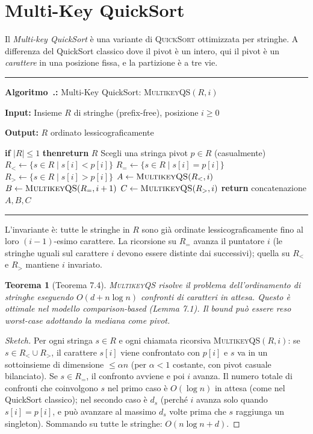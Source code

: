 \documentclass[12pt, a4paper, oneside]{book}
\newcounter{algocf}[chapter]
\renewcommand{\thealgocf}{\thechapter.\arabic{algocf}}
\newenvironment{algorithm}[1][H]{%
  \refstepcounter{algocf}%
  \par\medskip\noindent\rule{\linewidth}{0.4pt}\par\smallskip
}{%
  \par\smallskip\noindent\rule{\linewidth}{0.4pt}\par\medskip
}
\newcommand{\algcaption}[1]{\noindent\textbf{Algoritmo~\thealgocf:} #1\par\smallskip}
\newcommand{\KwIn}[1]{\noindent\textbf{Input:} #1\par}
\newcommand{\KwOut}[1]{\noindent\textbf{Output:} #1\par}
\newcommand{\If}[1]{\noindent\textbf{if} #1 \textbf{then}}
\newcommand{\Return}[1]{\noindent\textbf{return} #1}
\theoremstyle{plain}
\newtheorem{teorema}{Teorema}[chapter]
\theoremstyle{definition}
\theoremstyle{remark}
\begin{document}
\section{Multi-Key QuickSort}

Il \emph{Multi-key QuickSort} è una variante di \textsc{QuickSort} ottimizzata per stringhe. A differenza del QuickSort classico dove il pivot è un intero, qui il pivot è un \emph{carattere} in una posizione fissa, e la partizione è a tre vie.

\begin{algorithm}[H]
\algcaption{Multi-Key QuickSort: \textsc{MultikeyQS}$(R, i)$}
\KwIn{Insieme $R$ di stringhe (prefix-free), posizione $i \ge 0$}
\KwOut{$R$ ordinato lessicograficamente}
\If{$|R| \le 1$}{\Return{$R$}\;}
Scegli una stringa pivot $p \in R$ (casualmente)\;
$R_{<} \leftarrow \{s \in R \mid s[i] < p[i]\}$\;
$R_{=} \leftarrow \{s \in R \mid s[i] = p[i]\}$\;
$R_{>} \leftarrow \{s \in R \mid s[i] > p[i]\}$\;
$A \leftarrow \textsc{MultikeyQS}(R_{<}, i)$\;
$B \leftarrow \textsc{MultikeyQS}(R_{=}, i+1)$\;
$C \leftarrow \textsc{MultikeyQS}(R_{>}, i)$\;
\Return{concatenazione $A, B, C$}\;
\end{algorithm}

L'invariante è: tutte le stringhe in $R$ sono già ordinate lessicograficamente fino al loro $(i-1)$-esimo carattere. La ricorsione su $R_{=}$ avanza il puntatore $i$ (le stringhe uguali sul carattere $i$ devono essere distinte dai successivi); quella su $R_{<}$ e $R_{>}$ mantiene $i$ invariato.

\begin{teorema}[Teorema 7.4]
\textsc{MultikeyQS} risolve il problema dell'ordinamento di stringhe eseguendo $O(d + n\log n)$ confronti di caratteri in attesa. Questo è ottimale nel modello comparison-based (Lemma 7.1). Il bound può essere reso worst-case adottando la mediana come pivot.
\end{teorema}

\begin{proof}[Sketch]
Per ogni stringa $s \in R$ e ogni chiamata ricorsiva \textsc{MultikeyQS}$(R, i)$: se $s \in R_{<} \cup R_{>}$, il carattere $s[i]$ viene confrontato con $p[i]$ e $s$ va in un sottoinsieme di dimensione $\le \alpha n$ (per $\alpha < 1$ costante, con pivot casuale bilanciato). Se $s \in R_{=}$, il confronto avviene e poi $i$ avanza. Il numero totale di confronti che coinvolgono $s$ nel primo caso è $O(\log n)$ in attesa (come nel QuickSort classico); nel secondo caso è $d_s$ (perché $i$ avanza solo quando $s[i] = p[i]$, e può avanzare al massimo $d_s$ volte prima che $s$ raggiunga un singleton). Sommando su tutte le stringhe: $O(n\log n + d)$.
\end{proof}
\end{document}
